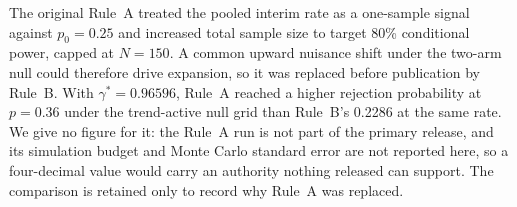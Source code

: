 \documentclass[11pt]{article}
\begin{document}
The original Rule~A treated the pooled interim rate as a one-sample signal
against $p_0=0.25$ and increased total sample size to target 80\% conditional
power, capped at $N=150$.  A common upward nuisance shift under the two-arm null
could therefore drive expansion, so it was replaced before publication by
Rule~B.  With $\gamma^*=0.96596$, Rule~A reached a higher rejection
probability at $p=0.36$ under the trend-active null grid than Rule~B's 0.2286
at the same rate.  We give no figure for it: the Rule~A run is not part of the
primary release, and its simulation budget and Monte Carlo standard error are
not reported here, so a four-decimal value would carry an authority nothing
released can support.  The comparison is retained only to record why Rule~A was
replaced.

\setlength{\bibsep}{0.6ex plus 0.2ex}


\end{document}
